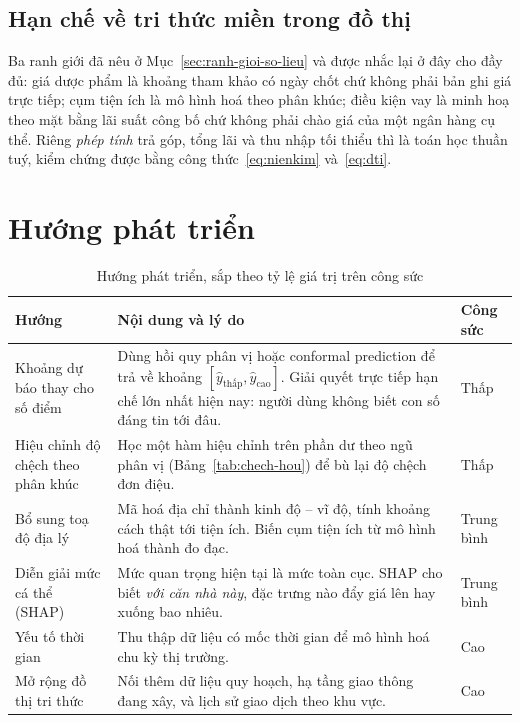 \subsection{Hạn chế về tri thức miền trong đồ thị}

Ba ranh giới đã nêu ở Mục~\ref{sec:ranh-gioi-so-lieu} và được nhắc lại ở đây cho
đầy đủ: giá dược phẩm là khoảng tham khảo có ngày chốt chứ không phải bản ghi
giá trực tiếp; cụm tiện ích là mô hình hoá theo phân khúc; điều kiện vay là minh
hoạ theo mặt bằng lãi suất công bố chứ không phải chào giá của một ngân hàng cụ
thể. Riêng \emph{phép tính} trả góp, tổng lãi và thu nhập tối thiểu thì là toán
học thuần tuý, kiểm chứng được bằng công thức~\eqref{eq:nienkim} và~\eqref{eq:dti}.

\section{Hướng phát triển}
\label{sec:huongphattrien}

\begin{table}[H]
\centering
\caption{Hướng phát triển, sắp theo tỷ lệ giá trị trên công sức}
\label{tab:huongphattrien}
\small
\begin{tabularx}{\textwidth}{@{}L{4.2cm}XL{1.9cm}@{}}
\toprule
\textbf{Hướng} & \textbf{Nội dung và lý do} & \textbf{Công sức} \\
\midrule
Khoảng dự báo thay cho số điểm &
Dùng hồi quy phân vị hoặc conformal prediction để trả về khoảng
$[\hat y_{\text{thấp}}, \hat y_{\text{cao}}]$. Giải quyết trực tiếp hạn chế lớn
nhất hiện nay: người dùng không biết con số đáng tin tới đâu. &
Thấp \\
\addlinespace
Hiệu chỉnh độ chệch theo phân khúc &
Học một hàm hiệu chỉnh trên phần dư theo ngũ phân vị
(Bảng~\ref{tab:chech-hou}) để bù lại độ chệch đơn điệu. &
Thấp \\
\addlinespace
Bổ sung toạ độ địa lý &
Mã hoá địa chỉ thành kinh độ -- vĩ độ, tính khoảng cách thật tới tiện ích. Biến
cụm tiện ích từ mô hình hoá thành đo đạc. &
Trung bình \\
\addlinespace
Diễn giải mức cá thể (SHAP) &
Mức quan trọng hiện tại là mức toàn cục. SHAP cho biết \emph{với căn nhà này},
đặc trưng nào đẩy giá lên hay xuống bao nhiêu. &
Trung bình \\
\addlinespace
Yếu tố thời gian &
Thu thập dữ liệu có mốc thời gian để mô hình hoá chu kỳ thị trường. &
Cao \\
\addlinespace
Mở rộng đồ thị tri thức &
Nối thêm dữ liệu quy hoạch, hạ tầng giao thông đang xây, và lịch sử giao dịch
theo khu vực. &
Cao \\
\bottomrule
\end{tabularx}
\end{table}

